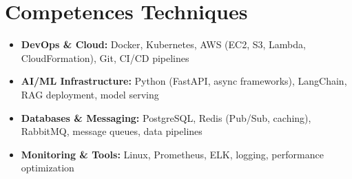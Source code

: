 \documentclass[a4paper,11pt]{article}
\begin{document}
\section{Competences Techniques}
\begin{itemize}[leftmargin=*, nosep]
    \item \small{\textbf{DevOps \& Cloud:} Docker, Kubernetes, AWS (EC2, S3, Lambda, CloudFormation), Git, CI/CD pipelines}
    \item \small{\textbf{AI/ML Infrastructure:} Python (FastAPI, async frameworks), LangChain, RAG deployment, model serving}
    \item \small{\textbf{Databases \& Messaging:} PostgreSQL, Redis (Pub/Sub, caching), RabbitMQ, message queues, data pipelines}
    \item \small{\textbf{Monitoring \& Tools:} Linux, Prometheus, ELK, logging, performance optimization}
\end{itemize}
\end{document}
